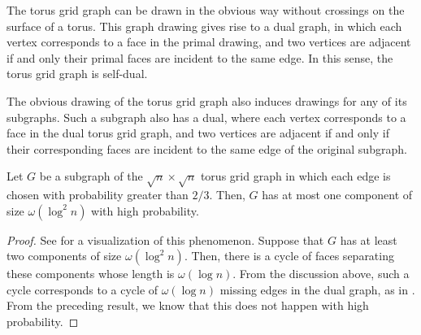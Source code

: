 \documentclass{patmorin}
\begin{document}
The torus grid graph can be drawn in the obvious way without crossings
on the surface of a torus. This graph drawing gives rise to a dual
graph, in which each vertex corresponds to a face in the primal
drawing, and two vertices are adjacent if and only their primal faces
are incident to the same edge. In this sense, the torus grid graph is
self-dual.

The obvious drawing of the torus grid graph also induces drawings for
any of its subgraphs. Such a subgraph also has a dual, where each
vertex corresponds to a face in the dual torus grid graph, and two
vertices are adjacent if and only if their corresponding faces are
incident to the same edge of the original subgraph.

\begin{thm}
  Let $G$ be a subgraph of the $\sqrt{n} \times \sqrt{n}$ torus grid
  graph in which each edge is chosen with probability greater than
  $2/3$. Then, $G$ has at most one component of size
  $\omega(\log^2 n)$ with high probability.
\end{thm}
\begin{proof}
  See  for a visualization of this phenomenon. Suppose
  that $G$ has at least two components of size $\omega(\log^2
  n)$. Then, there is a cycle of faces separating these components
  whose length is $\omega(\log n)$. From the discussion above, such a
  cycle corresponds to a cycle of $\omega(\log n)$ missing edges in
  the dual graph, as in . From the preceding
  result, we know that this does not happen with high probability.
\end{proof}
\end{document}

